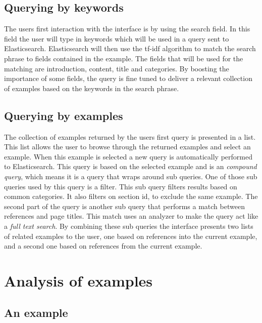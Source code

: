 \subsection{Querying by keywords}

The users first interaction with the interface is by using the search field. In this field the user will type in keywords which will be used in a query sent to Elasticsearch. Elasticsearch will then use the tf-idf algorithm to match the search phrase to fields contained in the example. The fields that will be used for the matching are introduction, content, title and categories. By boosting the importance of some fields, the query is fine tuned to deliver a relevant collection of examples based on the keywords in the search phrase.


\subsection{Querying by examples}
The collection of examples returned by the users first query is presented in a list. This list allows the user to browse through the returned examples and select an example. When this example is selected a new query is automatically performed to Elasticsearch. This query is based on the selected example and is an \textit{compound query}, which means it is a query that wraps around sub queries. One of those sub queries used by this query is a filter. This sub query filters results based on common categories. It also filters on section id, to exclude the same example. The second part of the query is another sub query that performs a match between references and page titles. This match uses an analyzer to make the query act like a \textit{full text search}. %
By combining these sub queries the interface presents two lists of related examples to the user, one based on references into the current example, and a second one based on references from the current example. 

\section{Analysis of examples} \label{examples-section} %

\subsection{An example}

